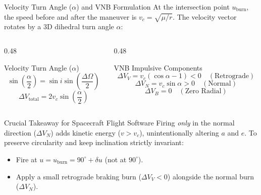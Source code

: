 \documentclass[aspectratio=169,10pt]{beamer}
\begin{document}
\begin{frame}{Velocity Turn Angle (\texorpdfstring{$\alpha$}{alpha}) and VNB Formulation}
    \footnotesize
    At the intersection point $u_{\text{burn}}$, the speed before and after the maneuver is $v_c = \sqrt{\mu/r}$. The velocity vector rotates by a 3D dihedral turn angle $\alpha$:
    \vspace{-0.1cm}
    \begin{columns}[t]
        \begin{column}{0.48\textwidth}
            \begin{block}{Velocity Turn Angle ($\alpha$)}
                \scriptsize
                $$\sin\left(\frac{\alpha}{2}\right) = \sin i \sin\left(\frac{\Delta\Omega}{2}\right)$$
                $$\Delta V_{\text{total}} = 2 v_c \sin\left(\frac{\alpha}{2}\right)$$
            \end{block}
        \end{column}
        \begin{column}{0.48\textwidth}
            \begin{block}{VNB Impulsive Components}
                \scriptsize
                $$\Delta V_V = v_c(\cos\alpha - 1) < 0 \quad (\text{Retrograde})$$
                $$\Delta V_N = v_c \sin\alpha > 0 \quad (\text{Normal})$$
                $$\Delta V_B = 0 \quad (\text{Zero Radial})$$
            \end{block}
        \end{column}
    \end{columns}
    
    \vspace{0.15cm}
    \begin{alertblock}{Crucial Takeaway for Spacecraft Flight Software}
        \scriptsize
        Firing \textit{only} in the normal direction ($\Delta V_N$) adds kinetic energy ($v > v_c$), unintentionally altering $a$ and $e$. To preserve circularity and keep inclination strictly invariant:
        \begin{itemize}\setlength{\itemsep}{1pt}
            \item Fire at $u = u_{\text{burn}} = 90^\circ + \delta u$ (not at $90^\circ$).
            \item Apply a small retrograde braking burn ($\Delta V_V < 0$) alongside the normal burn ($\Delta V_N$).
        \end{itemize}
    \end{alertblock}
\end{frame}
\end{document}
